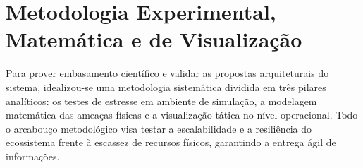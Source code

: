 \section{Metodologia Experimental, Matemática e de Visualização}

Para prover embasamento científico e validar as propostas arquiteturais do sistema, idealizou-se uma metodologia sistemática dividida em três pilares analíticos: os testes de estresse em ambiente de simulação, a modelagem matemática das ameaças físicas e a visualização tática no nível operacional. Todo o arcabouço metodológico visa testar a escalabilidade e a resiliência do ecossistema frente à escassez de recursos físicos, garantindo a entrega ágil de informações.







